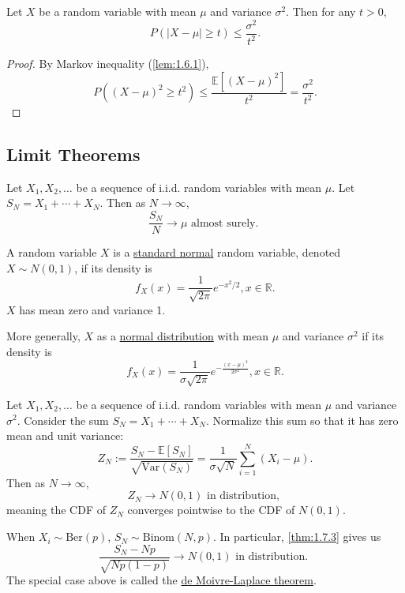 \begin{corollary}
Let $X$ be a random variable with mean $\mu$ and variance $\sigma^2$. Then for any $t > 0$, 
\[ P(|X - \mu| \geq t) \leq \frac{\sigma^2}{t^2}. \]
\end{corollary}

\begin{proof}
By Markov inequality (\cref{lem:1.6.1}), 
\[ P((X - \mu)^2 \geq t^2) \leq \frac{\mathbb{E}[(X - \mu)^2]}{t^2} = \frac{\sigma^2}{t^2}. \]
\end{proof}

\subsection{Limit Theorems}

\begin{theorem}
\label{thm:1.7.1}
Let $X_1, X_2, \dots$ be a sequence of i.i.d. random variables with mean $\mu$. Let $S_N = X_1 + \cdots 
+ X_N$. Then as $N \to \infty$, 
\[ \frac{S_N}{N} \to \mu \text{ almost surely. } \]
\end{theorem}

\begin{definition}[]
\label{def:1.7.2}
A random variable $X$ is a \underline{standard normal} random variable, denoted $X \sim N(0, 1)$, if 
its density is 
\[ f_X(x) = \frac{1}{\sqrt{2 \pi}}e^{-x^2 / 2}, x \in \mathbb{R}. \]
$X$ has mean zero and variance 1.

More generally, $X$ as a \underline{normal distribution} with mean $\mu$ and variance $\sigma^2$ if 
its density is 
\[ f_X(x) = \frac{1}{\sigma \sqrt{2 \pi}} e^{-\frac{(x - \mu)^2}{2 \sigma^2}}, x \in \mathbb{R}. \]
\end{definition}

\begin{theorem}
\label{thm:1.7.3}
Let $X_1, X_2, \dots$ be a sequence of i.i.d. random variables with mean $\mu$ and variance $\sigma^2$. 
Consider the sum $S_N = X_1 + \cdots + X_N$. Normalize this sum so that it has zero mean and unit variance: 
\[ Z_N := \frac{S_N - \mathbb{E}[S_N]}{\sqrt{\mathrm{Var}(S_N)}} = 
\frac{1}{\sigma \sqrt{N}} \sum_{i = 1}^{N} (X_i - \mu). \]
Then as $N \to \infty$, 
\[ Z_N \to N(0, 1) \text{ in distribution, } \]
meaning the CDF of $Z_N$ converges pointwise to the CDF of $N(0, 1)$. 
\end{theorem}

\begin{example}
\label{ex:1.7.4}
When $X_i \sim \text{Ber}(p)$, $S_N \sim \text{Binom}(N, p)$. In particular, \cref{thm:1.7.3} gives us
\[ \frac{S_N - Np}{\sqrt{Np(1 - p)}} \to N(0, 1) \text{ in distribution. } \]
The special case above is called the \underline{de Moivre-Laplace theorem}.
\end{example}

